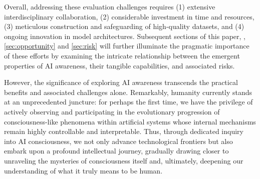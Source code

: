 Overall, addressing these evaluation challenges requires (1) extensive interdisciplinary collaboration, (2) considerable investment in time and resources, (3) meticulous construction and safeguarding of high-quality datasets, and (4) ongoing innovation in model architectures. Subsequent sections of this paper, \ie, \autoref{sec:opportunity} and \autoref{sec:risk} will further illuminate the pragmatic importance of these efforts by examining the intricate relationship between the emergent properties of AI awareness, their tangible capabilities, and associated risks.

However, the significance of exploring AI awareness transcends the practical benefits and associated challenges alone. Remarkably, humanity currently stands at an unprecedented juncture: for perhaps the first time, we have the privilege of actively observing and participating in the evolutionary progression of consciousness-like phenomena within artificial systems whose internal mechanisms remain highly controllable and interpretable. Thus, through dedicated inquiry into AI consciousness, we not only advance technological frontiers but also embark upon a profound intellectual journey, gradually drawing closer to unraveling the mysteries of consciousness itself and, ultimately, deepening our understanding of what it truly means to be human.